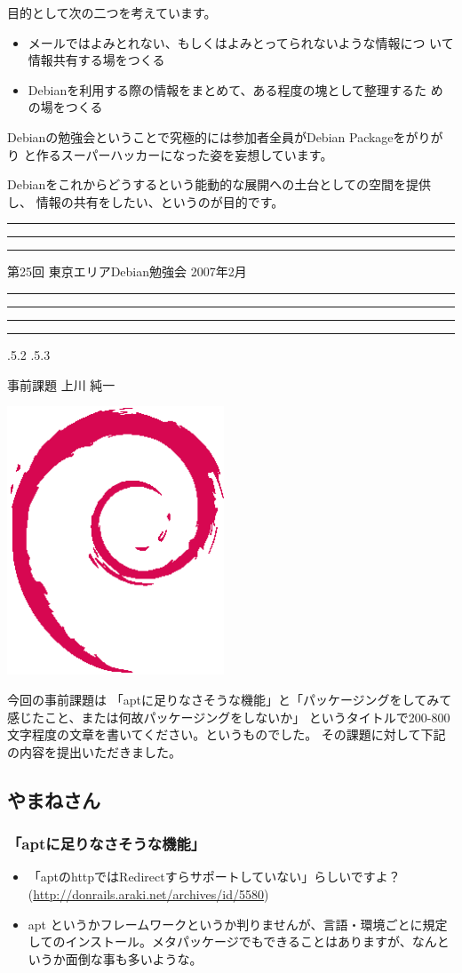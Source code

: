 \documentclass[mingoth,a4paper]{jsarticle}
\makeatletter
\newcommand{\debmtgyear}{2007}
\newcommand{\debmtgmonth}{2}
\newcommand{\debmtgnumber}{25}
\renewcommand{\section}{\@startsection{section}{1}{\z@}%
    {\Cvs \@plus.5\Cdp \@minus.2\Cdp}%
    {.5\Cvs \@plus.3\Cdp}%
    {\normalfont\gt\fontsize{32}{32}\headfont\raggedright}} %
\newcommand{\dancersection}[2]{%
\newpage
第\debmtgnumber{}回 東京エリアDebian勉強会 \debmtgyear{}年\debmtgmonth{}月
\hrule
\vspace{0.5mm}
\hrule
%
\vspace{4cm}
\hrule
\vspace{0.5mm}
\hrule
%
\vspace{-7cm}
\begin{minipage}[b]{0.7\hsize}
\section{#1}
\hfill{}#2\\
\vspace{2cm}
\end{minipage}
\begin{minipage}[b]{0.3\hsize}
\hfill{}\includegraphics[height=8cm]{image200502/openlogo-nd.eps}\\
\end{minipage}
%
\vspace{-1cm}
}
\makeatother
\begin{document}
 目的として次の二つを考えています。

 \begin{itemize}
 \item メールではよみとれない、もしくはよみとってられないような情報につ
       いて情報共有する場をつくる
 \item Debianを利用する際の情報をまとめて、ある程度の塊として整理するた
       めの場をつくる
 \end{itemize}

 Debianの勉強会ということで究極的には参加者全員がDebian Packageをがりがり
 と作るスーパーハッカーになった姿を妄想しています。

 Debianをこれからどうするという能動的な展開への土台としての空間を提供し、
 情報の共有をしたい、というのが目的です。


\newpage

\begin{minipage}[b]{0.2\hsize}
 \colorbox{titleback}{}
\end{minipage}
\begin{minipage}[b]{0.8\hsize}
\hrule
\vspace{2mm}
\hrule
\tableofcontents
\vspace{2mm}
\hrule
\end{minipage}

\dancersection{事前課題}{上川 純一}

今回の事前課題は
「aptに足りなさそうな機能」と「パッケージングをしてみて感じたこと、または何故パッケージングをしないか」
というタイトルで200-800文字程度の文章を書いてください。というものでした。
その課題に対して下記の内容を提出いただきました。


\subsection{やまねさん}
\subsubsection*{「aptに足りなさそうな機能」}

\begin{itemize}
 \item 「aptのhttpではRedirectすらサポートしていない」らしいですよ？(\url{http://donrails.araki.net/archives/id/5580})
 \item apt というかフレームワークというか判りませんが、言語・環境ごとに規定してのインストール。メタパッケージでもできることはありますが、なんというか面倒な事も多いような。
\end{itemize}
\end{document}
